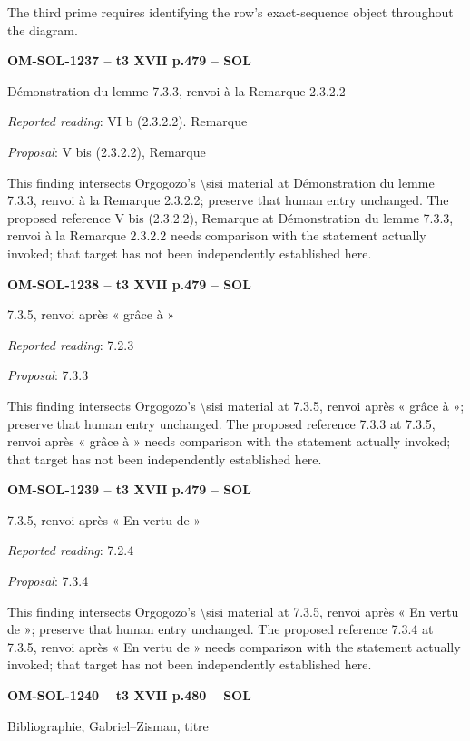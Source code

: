 The third prime requires identifying the row's exact-sequence object throughout the diagram.\par
\par\noindent\textbf{OM-SOL-1237 -- t3 XVII p.479 -- SOL}\par
Démonstration du lemme 7.3.3, renvoi à la Remarque 2.3.2.2\par
\emph{Reported reading}: VI b (2.3.2.2). Remarque\par
\emph{Proposal}: V bis (2.3.2.2), Remarque\par
This finding intersects Orgogozo's \textbackslash{}sisi material at Démonstration du lemme 7.3.3, renvoi à la Remarque 2.3.2.2; preserve that human entry unchanged. The proposed reference V bis (2.3.2.2), Remarque at Démonstration du lemme 7.3.3, renvoi à la Remarque 2.3.2.2 needs comparison with the statement actually invoked; that target has not been independently established here.\par
\par\noindent\textbf{OM-SOL-1238 -- t3 XVII p.479 -- SOL}\par
7.3.5, renvoi après « grâce à »\par
\emph{Reported reading}: 7.2.3\par
\emph{Proposal}: 7.3.3\par
This finding intersects Orgogozo's \textbackslash{}sisi material at 7.3.5, renvoi après « grâce à »; preserve that human entry unchanged. The proposed reference 7.3.3 at 7.3.5, renvoi après « grâce à » needs comparison with the statement actually invoked; that target has not been independently established here.\par
\par\noindent\textbf{OM-SOL-1239 -- t3 XVII p.479 -- SOL}\par
7.3.5, renvoi après « En vertu de »\par
\emph{Reported reading}: 7.2.4\par
\emph{Proposal}: 7.3.4\par
This finding intersects Orgogozo's \textbackslash{}sisi material at 7.3.5, renvoi après « En vertu de »; preserve that human entry unchanged. The proposed reference 7.3.4 at 7.3.5, renvoi après « En vertu de » needs comparison with the statement actually invoked; that target has not been independently established here.\par
\par\noindent\textbf{OM-SOL-1240 -- t3 XVII p.480 -- SOL}\par
Bibliographie, Gabriel–Zisman, titre\par
